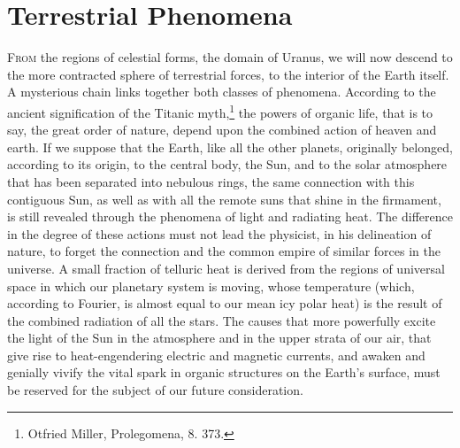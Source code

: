 \chapter{Terrestrial Phenomena}

\lettrine[lines=4]{\goudy F}{rom} the regions of celestial forms, the domain of Uranus, we will now descend to the more contracted sphere of terrestrial forces, to the interior of the Earth itself. A mysterious chain links together both classes of phenomena. According to the ancient signification of the Titanic myth,\footnote{Otfried Miller, Prolegomena, 8. 373.} the powers of organic life, that is to say, the great order of nature, depend upon the combined action of heaven and earth. If we suppose that the Earth, like all the other planets, originally belonged, according to its origin, to the central body, the Sun, and to the solar atmosphere that has been separated into nebulous rings, the same connection with this contiguous Sun, as well as with all the remote suns that shine in the firmament, is still revealed through the phenomena of light and radiating heat. The difference in the degree of these actions must not lead the physicist, in his delineation of nature, to forget the connection and the common empire of similar forces in the universe. A small fraction of telluric heat is derived from the regions of universal space in which our planetary system is moving, whose temperature (which, according to Fourier, is almost equal to our mean icy polar heat) is the result of the combined radiation of all the stars. The causes that more powerfully excite the light of the Sun in the atmosphere and in the upper strata of our air, that give rise to heat-engendering electric and magnetic currents, and awaken and genially vivify the vital spark in organic structures on the Earth's surface, must be reserved for the subject of our future consideration.

